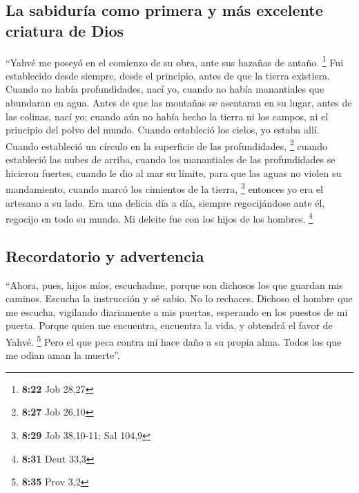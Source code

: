\begin{paracol}{2}
\hypertarget{la-sabiduruxeda-como-primera-y-muxe1s-excelente-criatura-de-dios}{%
\subsection{La sabiduría como primera y más excelente criatura de
Dios}\label{la-sabiduruxeda-como-primera-y-muxe1s-excelente-criatura-de-dios}}

 ``Yahvé me poseyó en el comienzo de su obra, ante sus
hazañas de antaño. \footnote{\textbf{8:22} Job 28,27} 
Fui establecido desde siempre, desde el principio, antes de que la
tierra existiera.  Cuando no había profundidades, nací
yo, cuando no había manantiales que abundaran en agua. 
Antes de que las montañas se asentaran en su lugar, antes de las
colinas, nací yo;  cuando aún no había hecho la tierra ni
los campos, ni el principio del polvo del mundo.  Cuando
estableció los cielos, yo estaba allí. Cuando estableció un círculo en
la superficie de las profundidades, \footnote{\textbf{8:27} Job 26,10}
 cuando estableció las nubes de arriba, cuando los
manantiales de las profundidades se hicieron fuertes, 
cuando le dio al mar su límite, para que las aguas no violen su
mandamiento, cuando marcó los cimientos de la tierra, \footnote{\textbf{8:29}
  Job 38,10-11; Sal 104,9}  entonces yo era el artesano a
su lado. Era una delicia día a día, siempre regocijándose ante él,
 regocijo en todo su mundo. Mi deleite fue con los hijos
de los hombres. \footnote{\textbf{8:31} Deut 33,3}

\hypertarget{recordatorio-y-advertencia}{%
\subsection{Recordatorio y
advertencia}\label{recordatorio-y-advertencia}}

 ``Ahora, pues, hijos míos, escuchadme, porque son
dichosos los que guardan mis caminos.  Escucha la
instrucción y sé sabio. No lo rechaces.  Dichoso el
hombre que me escucha, vigilando diariamente a mis puertas, esperando en
los puestos de mi puerta.  Porque quien me encuentra,
encuentra la vida, y obtendrá el favor de Yahvé. \footnote{\textbf{8:35}
  Prov 3,2}  Pero el que peca contra mí hace daño a su
propia alma. Todos los que me odian aman la muerte''.


\end{paracol}
